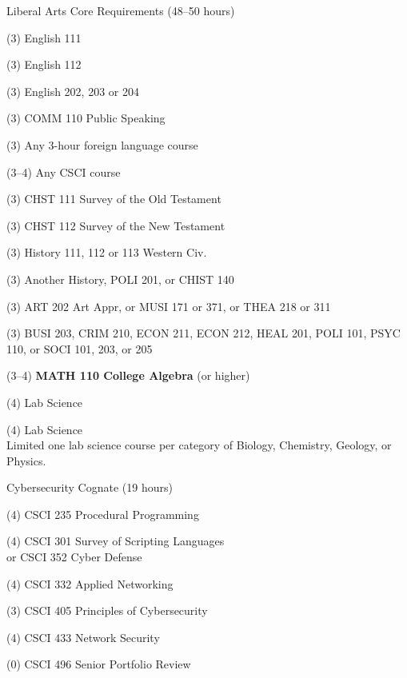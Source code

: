 \begin{reqgroup}{Liberal Arts Core Requirements (48--50 hours)}
\begin{checklist}
\begin{minipage}[t]{0.5\linewidth}
	\item (3) English 111
	\item (3) English 112
	\item (3) English 202, 203 or 204
	\item (3) COMM 110 Public Speaking
	\item (3) Any 3-hour foreign language course
	\item (3--4) Any CSCI course
	\item (3) CHST 111  Survey of the Old Testament
	\item (3) CHST 112  Survey of the New Testament
	\item (3) History 111, 112 or 113 Western Civ.
\end{minipage}
\begin{minipage}[t]{0.5\linewidth}
	\item (3)	Another History, POLI 201, or CHIST 140
	\item (3)	ART 202 Art Appr, or MUSI 171 or 371, or THEA 218 or 311
	\item (3)	BUSI 203, CRIM 210, ECON 211, ECON 212, HEAL 201, POLI 101, PSYC 110, or SOCI 101, 203, or 205
	\item (3--4)	\textbf{MATH 110 College Algebra} (or higher)
	\item (4)	Lab Science
	\item (4)	Lab Science\\Limited one lab science course per category of Biology, Chemistry,
Geology, or Physics.
\end{minipage}
\end{checklist}
\end{reqgroup}


\begin{reqgroup}{Cybersecurity Cognate (19 hours)}%
\begin{checklist}%
\begin{minipage}[t]{0.5\linewidth}%
	\item (4) CSCI 235 Procedural Programming
	\item (4) CSCI 301 Survey of Scripting Languages\\
		or CSCI 352 Cyber Defense
	\item (4) CSCI 332 Applied Networking
\end{minipage}%
\begin{minipage}[t]{0.5\linewidth}
	\item (3) CSCI 405 Principles of Cybersecurity
	\item (4) CSCI 433 Network Security
	\item (0) CSCI 496 Senior Portfolio Review
\end{minipage}
\end{checklist}
\end{reqgroup}

